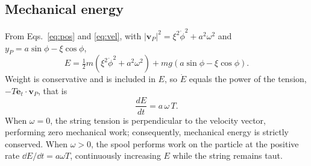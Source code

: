 \documentclass[11pt,a4paper]{article}
\newcommand{\dt}[1]{\dot{#1}}
\newcommand{\et}{\bm{e}_t}
\begin{document}
\subsection{Mechanical energy}

From Eqs.~\eqref{eq:pos} and \eqref{eq:vel}, with $|\bm v_P|^2=\xi^2\dt\phi^2+a^2\omega^2$ and $y_P=a\sin\phi-\xi\cos\phi$,
\begin{equation}
E=\tfrac12 m\left(\xi^{2}\dt{\phi}^{2}+a^{2}\omega^{2}\right)+mg\left(a\sin\phi-\xi\cos\phi\right).
\label{eq:E}
\end{equation}
Weight is conservative and is included in $E$, so $\dt E$ equals the power of the tension, $-T\et\cdot\bm v_P$, that is
\begin{equation}
\frac{dE}{d t}=a\,\omega\,T .
\label{eq:Edot}
\end{equation}
When $\omega=0$, the string tension is perpendicular to the velocity vector, performing zero mechanical work; consequently, mechanical energy is strictly conserved. When $\omega>0$, the spool performs work on the particle at the positive rate $\dd E/\dd t = a\omega T$, continuously increasing $E$ while the string remains taut.
\end{document}
